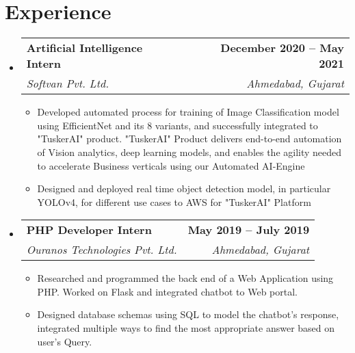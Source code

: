 \documentclass[letterpaper,11pt]{article}
\makeatletter
\newcommand{\resumeItem}[1]{
  \item\small{
    {#1 \vspace{-2pt}}
  }
}
\newcommand{\resumeSubheading}[4]{
  \vspace{-2pt}\item
    \begin{tabular*}{1.0\textwidth}[t]{l@{\extracolsep{\fill}}r}
      \textbf{#1} & \textbf{\small #2} \\
      \textit{\small#3} & \textit{\small #4} \\
    \end{tabular*}\vspace{-7pt}
}
\newcommand{\resumeSubHeadingListStart}{\begin{itemize}[leftmargin=0.0in, label={}]}
\newcommand{\resumeSubHeadingListEnd}{\end{itemize}}
\newcommand{\resumeItemListStart}{\begin{itemize}}
\newcommand{\resumeItemListEnd}{\end{itemize}\vspace{-5pt}}
\makeatother
\begin{document}
\section{Experience}
  \resumeSubHeadingListStart
    \resumeSubheading
      {Artificial Intelligence Intern}{December 2020 -- May 2021}
      {Softvan Pvt. Ltd.}{Ahmedabad, Gujarat}
      \resumeItemListStart
        \resumeItem{Developed automated process for training of Image Classification model using EfficientNet and its 8 variants, and successfully integrated to "TuskerAI" product. "TuskerAI" Product delivers end-to-end automation of Vision analytics, deep learning models, and enables the agility needed to accelerate Business verticals using our Automated AI-Engine}
        \resumeItem{Designed and deployed real time object detection model, in particular YOLOv4, for different use cases to AWS for "TuskerAI" Platform}
      \resumeItemListEnd

    \resumeSubheading
      {PHP Developer Intern}{May 2019 -- July 2019}
      {Ouranos Technologies Pvt. Ltd.}{Ahmedabad, Gujarat}
      \resumeItemListStart
        \resumeItem{Researched and programmed the back end of a Web Application using PHP. Worked on Flask and integrated chatbot to Web portal.}
        \resumeItem{Designed database schemas using SQL to model the chatbot's response, integrated multiple ways to find the most appropriate answer based on user's Query.}
    \resumeItemListEnd
    
  \resumeSubHeadingListEnd
\vspace{-18pt}

\end{document}
